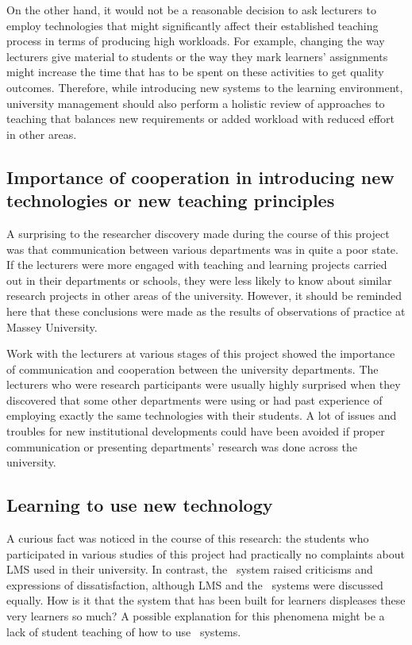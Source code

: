 On the other hand, it would not be a reasonable decision to ask lecturers to
employ technologies that might significantly affect their established
teaching process in terms of producing high workloads. For example, changing the
way lecturers give material to students or the way they mark learners'
assignments might increase the time that has to be spent on these activities to
get quality outcomes. Therefore, while introducing new systems to the learning
environment, university management should also perform a holistic review of
approaches to teaching that balances new requirements or added workload with
reduced effort in other areas.

\subsection[Cooperation and Communication]{Importance of cooperation in 
introducing new technologies or new teaching principles}

A surprising to the researcher discovery made during the course of this project
was that communication between various departments was in quite a poor state. If
the lecturers were more engaged with teaching and learning projects carried out
in their departments or schools, they were less likely to know about similar
research projects in other areas of the university. However, it should be
reminded here that these conclusions were made as the results of observations of
practice at Massey University.

Work with the lecturers at various stages of this project showed the importance
of communication and cooperation between the university departments. The
lecturers who were research participants were usually highly surprised when they
discovered that some other departments were using or had past experience of
employing exactly the same technologies with their students. A lot of issues and
troubles for new institutional developments could have been avoided if proper
communication or presenting departments' research was done across the university.

\subsection[Learning to Use New Technology]{Learning to use new technology}

A curious fact was noticed in the course of this research: the students who
participated in various studies of this project had practically no complaints
about LMS used in their university. In contrast, the \ep~system raised
criticisms and expressions of dissatisfaction, although LMS and the \ep~systems
were discussed equally. How is it that the system that has been built for
learners displeases these very learners so much? A possible explanation for this
phenomena might be a lack of student teaching of how to use \ep~systems.

